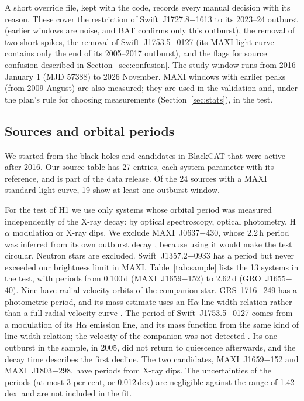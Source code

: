 \documentclass[fleqn,usenatbib]{mnras}
\newcommand{\dex}{\,dex}
\begin{document}
A short override file, kept with the code, records every manual decision with its reason. These cover the restriction of Swift~J1727.8$-$1613 to its 2023--24 outburst (earlier windows are noise, and BAT confirms only this outburst), the removal of two short spikes, the removal of Swift~J1753.5$-$0127 (its MAXI light curve contains only the end of its 2005--2017 outburst), and the flags for source confusion described in Section~\ref{sec:confusion}. The study window runs from 2016 January 1 (MJD 57388) to 2026 November. MAXI windows with earlier peaks (from 2009 August) are also measured; they are used in the validation and, under the plan's rule for choosing measurements (Section~\ref{sec:stats}), in the test.

\subsection{Sources and orbital periods}
\label{sec:sample}

We started from the black holes and candidates in BlackCAT \citep{CorralSantana2016} that were active after 2016. Our source table has 27 entries, each system parameter with its reference, and is part of the data release. Of the 24 sources with a MAXI standard light curve, 19 show at least one outburst window.

For the test of H1 we use only systems whose orbital period was measured independently of the X-ray decay: by optical spectroscopy, optical photometry, H$\alpha$ modulation or X-ray dips. We exclude MAXI~J0637$-$430, whose 2.2\,h period was inferred from its own outburst decay \citep{Soria2022}, because using it would make the test circular. Neutron stars are excluded. Swift~J1357.2$-$0933 has a period \citep{CorralSantana2013} but never exceeded our brightness limit in MAXI. Table~\ref{tab:sample} lists the 13 systems in the test, with periods from 0.100\,d (MAXI~J1659$-$152) to 2.62\,d (GRO~J1655$-$40). Nine have radial-velocity orbits of the companion star. GRS~1716$-$249 has a photometric period, and its mass estimate uses an H$\alpha$ line-width relation rather than a full radial-velocity curve \citep{Casares2023}. The period of Swift~J1753.5$-$0127 comes from a modulation of its H$\alpha$ emission line, and its mass function from the same kind of line-width relation; the velocity of the companion was not detected \citep{YanesRizo2025}. Its one outburst in the sample, in 2005, did not return to quiescence afterwards, and the decay time describes the first decline. The two candidates, MAXI~J1659$-$152 and MAXI~J1803$-$298, have periods from X-ray dips. The uncertainties of the periods (at most 3 per cent, or 0.012\dex) are negligible against the range of 1.42\dex\ and are not included in the fit.
\end{document}
